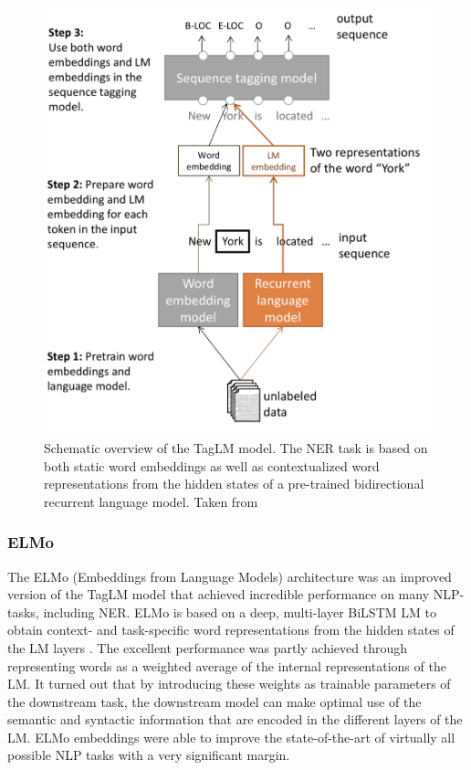 \documentclass[12pt,a4paper,]{book}
\begin{document}
\begin{figure}

{\centering \includegraphics[width=0.85\linewidth]{images/TagLM} 

}

\caption{Schematic overview of the TagLM model. The NER task is based on both static word embeddings as well as contextualized word representations from the hidden states of a pre-trained bidirectional recurrent language model. Taken from \citep{peters2017}}\label{fig:taglm}
\end{figure}



\hypertarget{elmo}{%
\subsubsection{ELMo}\label{elmo}}

The ELMo (Embeddings from Language Models) architecture was an improved version of the TagLM model that achieved incredible performance on many NLP-tasks, including NER. ELMo is based on a deep, multi-layer BiLSTM LM to obtain context- and task-specific word representations from the hidden states of the LM layers \citep{peters2018}. The excellent performance was partly achieved through representing words as a weighted average of the internal representations of the LM. It turned out that by introducing these weights as trainable parameters of the downstream task, the downstream model can make optimal use of the semantic and syntactic information that are encoded in the different layers of the LM. ELMo embeddings were able to improve the state-of-the-art of virtually all possible NLP tasks with a very significant margin.
\end{document}
